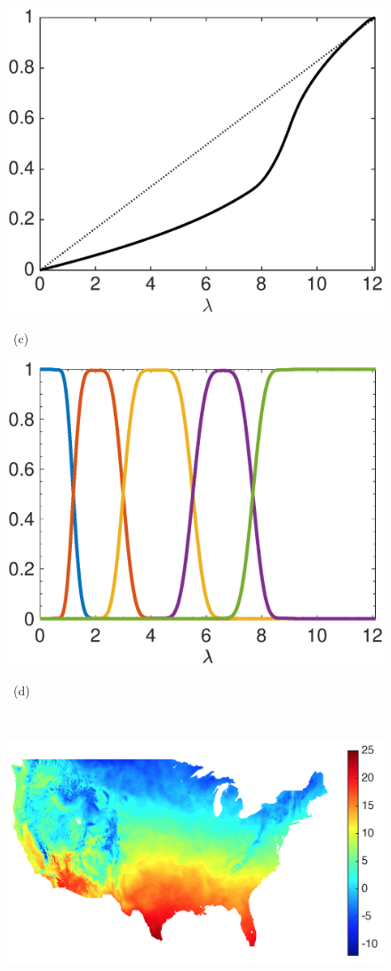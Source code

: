 \documentclass[journal, 10pt]{IEEEtran}
\begin{document}
\begin{figure}[tb]
\begin{minipage}[m]{0.24\linewidth}
\centerline{\includegraphics[width=.9\linewidth]{fig_temp_cdf}}
\centerline{~\small{(c)}}
\end{minipage} 
\begin{minipage}[m]{0.24\linewidth}
\centerline{\includegraphics[width=.9\linewidth]{fig_temp_fb}}
\centerline{~\small{(d)}}
\end{minipage} \medskip \\
\begin{minipage}[m]{0.24\linewidth}
\centerline{\includegraphics[width=.9\linewidth]{fig_temp_signal}}

\end{minipage}
\end{figure}
\end{document}
